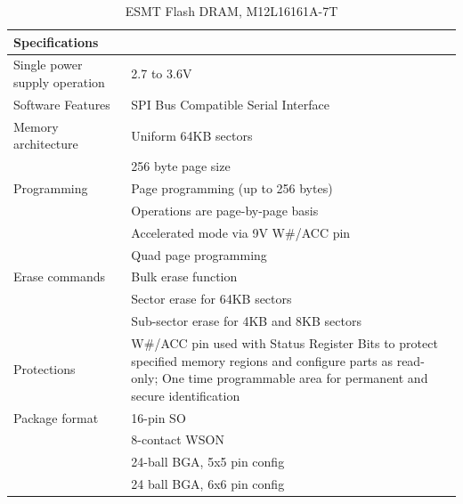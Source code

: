 \begin{table}
    \centering
    \label{fig:M12L16161A-7T}%
    \caption{ESMT Flash DRAM, M12L16161A-7T \autocite{alldatasheet.comM12L16161A7TDatasheetPDF}}
    \begin{tabular}{|p{4cm}|p{12cm}|}
      \hline\rowcolor{gray!30}
  
      \textbf{Specifications} &  \\
      \hline
  
      Single power supply operation & 2.7 to 3.6V \\
      \hline
  
      Software Features & SPI Bus Compatible Serial Interface \\
      \hline
  
      Memory architecture & Uniform 64KB sectors \\
      & 256 byte page size \\
      \hline
  
      Programming & Page programming (up to 256 bytes) \\
      & Operations are page-by-page basis \\
      & Accelerated mode via 9V W\#/ACC pin \\
      & Quad page programming \\
      \hline
  
      Erase commands & Bulk erase function \\
       & Sector erase for 64KB sectors \\
       & Sub-sector erase for 4KB and 8KB sectors \\
      \hline
  
      Protections & W\#/ACC pin used with Status Register Bits to protect specified memory regions and configure parts as read-only; One time programmable area for permanent and secure identification \\
      \hline
  
      Package format & 16-pin SO \\
      & 8-contact WSON \\
      & 24-ball BGA, 5x5 pin config \\
      & 24 ball BGA, 6x6 pin config \\
      \hline
  
    \end{tabular}
\end{table}

